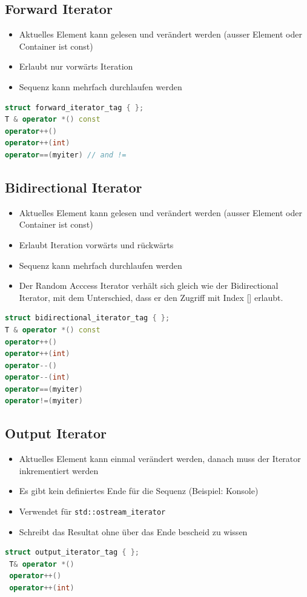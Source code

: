 \subsection{Forward Iterator}
\begin{itemize}
	\item Aktuelles Element kann gelesen und verändert werden (ausser Element oder Container ist const)
	\item Erlaubt nur vorwärts Iteration
	\item Sequenz kann mehrfach durchlaufen werden
\end{itemize}
\begin{lstlisting}[language=C++]
struct forward_iterator_tag { };
T & operator *() const
operator++()
operator++(int)
operator==(myiter) // and !=
\end{lstlisting}


\subsection{Bidirectional Iterator}
\begin{itemize}
	\item Aktuelles Element kann gelesen und verändert werden (ausser Element oder Container ist const)
	\item Erlaubt Iteration vorwärts und rückwärts
	\item Sequenz kann mehrfach durchlaufen werden
	\item Der Random Acccess Iterator verhält sich gleich wie der Bidirectional Iterator, mit dem Unterschied, dass er den Zugriff mit Index [] erlaubt.
\end{itemize}
\begin{lstlisting}[language=C++]
struct bidirectional_iterator_tag { };
T & operator *() const
operator++()
operator++(int)
operator--()
operator--(int)
operator==(myiter)
operator!=(myiter)
\end{lstlisting}

\subsection{Output Iterator}
\begin{itemize}
	\item Aktuelles Element kann einmal verändert werden, danach muss der Iterator inkrementiert werden
	\item Es gibt kein definiertes Ende für die Sequenz (Beispiel: Konsole)
	\item Verwendet für \lstinline|std::ostream_iterator|
	\item Schreibt das Resultat ohne über das Ende bescheid zu wissen
\end{itemize}
\begin{lstlisting}[language=C++]
 struct output_iterator_tag { };
 T& operator *()
 operator++()
 operator++(int)
\end{lstlisting}

